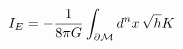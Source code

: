 \begin{equation}
I_{E}=-\frac{1}{8\pi G}\int_{\partial{\cal{M}}} d^{n}x\,\sqrt{h}K \label{on-shell}
\end{equation}

